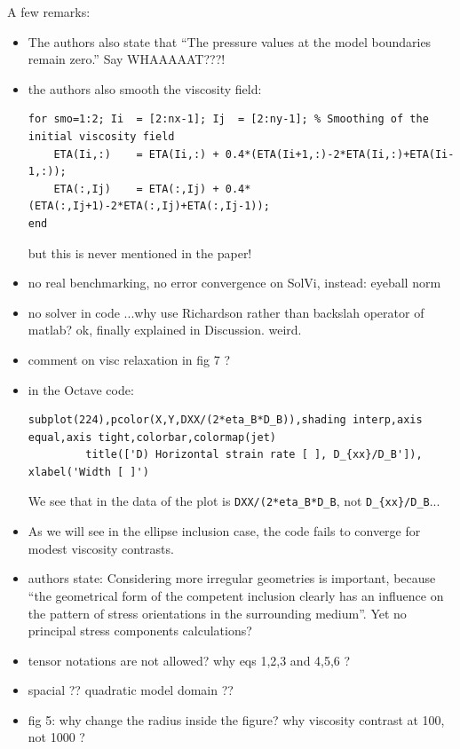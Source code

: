 A few remarks:
\begin{itemize}
\item The authors also state that ``The pressure values at the model boundaries remain zero.'' Say WHAAAAAT???!
\item the authors also smooth the viscosity field:
\begin{verbatim}
for smo=1:2; Ii  = [2:nx-1]; Ij  = [2:ny-1]; % Smoothing of the initial viscosity field
    ETA(Ii,:)    = ETA(Ii,:) + 0.4*(ETA(Ii+1,:)-2*ETA(Ii,:)+ETA(Ii-1,:));
    ETA(:,Ij)    = ETA(:,Ij) + 0.4*(ETA(:,Ij+1)-2*ETA(:,Ij)+ETA(:,Ij-1));
end
\end{verbatim}
but this is never mentioned in the paper!

\item no real benchmarking, no error convergence on SolVi, instead: eyeball norm
\item no solver in code ...why use Richardson rather than backslah operator of matlab? ok, finally explained in Discussion. weird.
\item comment on visc relaxation in fig 7 ? 
\item in the Octave code:
\begin{verbatim}
subplot(224),pcolor(X,Y,DXX/(2*eta_B*D_B)),shading interp,axis equal,axis tight,colorbar,colormap(jet)
         title(['D) Horizontal strain rate [ ], D_{xx}/D_B']), xlabel('Width [ ]')
\end{verbatim}
We see that in the data of the plot is \verb|DXX/(2*eta_B*D_B|, not \verb|D_{xx}/D_B|...

\item As we will see in the ellipse inclusion case, the code fails to converge
for modest viscosity contrasts.

\item authors state: Considering more irregular geometries is important, 
because “the geometrical form of the competent
inclusion clearly has an influence on the pattern of stress orientations in the
surrounding medium”. Yet no principal stress components calculations? 

\item tensor notations are not allowed? why eqs 1,2,3 and 4,5,6 ?

\item spacial ?? quadratic model domain ??

\item fig 5: why change the radius inside the figure? why viscosity contrast at 100, not 1000 ?


\end{itemize}
